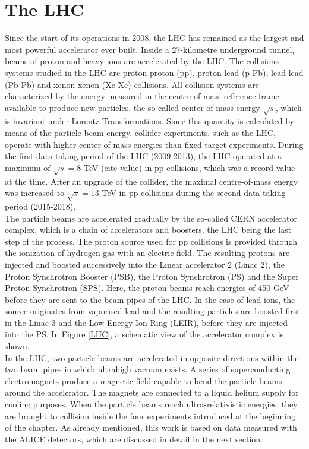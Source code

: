\documentclass[12pt,a4paper]{report}
\begin{document}
\section{The LHC}
Since the start of its operations in 2008, the LHC has remained as the largest and most powerful accelerator ever built. Inside a 27-kilometre underground tunnel, beams of proton and heavy ions are accelerated by the LHC. The collisions systems studied in the LHC are proton-proton (pp), proton-lead (p-Pb), lead-lead (Pb-Pb) and xenon-xenon (Xe-Xe) collisions. All collision systems are characterized by the energy measured in the centre-of-mass reference frame available to produce new particles, the so-called center-of-mass energy $\sqrt{s}$, which is invariant under Lorentz Transformations. Since this quantity is calculated by means of the particle beam energy, collider experiments, such as the LHC, operate with higher center-of-mass energies than fixed-target experiments. During the first data taking period of the LHC (2009-2013), the LHC operated at a maximum of $\sqrt{s} = 8$ TeV (cite value) in pp collisions, which was a record value at the time. After an upgrade of the collider, the maximal centre-of-mass energy was increased to $\sqrt{s} = 13$ TeV in pp collisions during the second data taking period (2015-2018).\\ 
The particle beams are accelerated gradually by the so-called CERN accelerator complex, which is a chain of accelerators and boosters, the LHC being the last step of the process. The proton source used for pp collisions is provided through the ionization of hydrogen gas with an electric field. The resulting protons are injected and boosted successively into the Linear accelerator 2 (Linac 2), the Proton Synchrotron Booster (PSB), the Proton Synchrotron (PS) and the  Super Proton Synchrotron (SPS). Here, the proton beams reach energies of 450 GeV before they are sent to the beam pipes of the LHC. In the case of lead ions, the source originates from vaporised lead and the resulting particles are boosted first in the Linac 3 and the Low Energy Ion Ring (LEIR), before they are injected into the PS. In Figure \ref{LHC}, a schematic view of the accelerator complex is shown. \\
In the LHC, two particle beams are accelerated in opposite directions within the two beam pipes in which ultrahigh vacuum exists. A series of superconducting electromagnets produce a magnetic field capable to bend the particle beams around the accelerator. The magnets are connected to a liquid helium supply for cooling purposes. When the particle beams reach ultra-relativistic energies, they are brought to collision inside the four experiments introduced at the beginning of the chapter. As already mentioned, this work is based on data measured with the ALICE detectors, which are discussed in detail in the next section.
\end{document}
